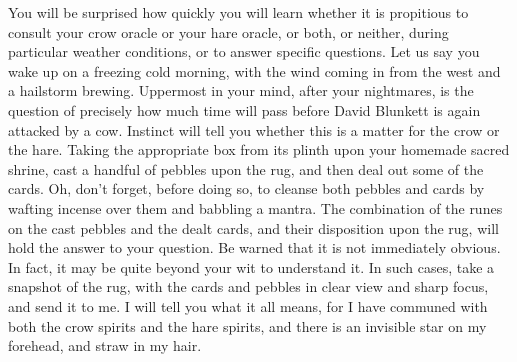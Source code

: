 You will be surprised how quickly you will learn whether it is propitious to consult your crow oracle or your hare oracle, or both, or neither, during particular weather conditions, or to answer specific questions. Let us say you wake up on a freezing cold morning, with the wind coming in from the west and a hailstorm brewing. Uppermost in your mind, after your nightmares, is the question of precisely how much time will pass before David Blunkett is again attacked by a cow. Instinct will tell you whether this is a matter for the crow or the hare. Taking the appropriate box from its plinth upon your homemade sacred shrine, cast a handful of pebbles upon the rug, and then deal out some of the cards. Oh, don't forget, before doing so, to cleanse both pebbles and cards by wafting incense over them and babbling a mantra. The combination of the runes on the cast pebbles and the dealt cards, and their disposition upon the rug, will hold the answer to your question. Be warned that it is not immediately obvious. In fact, it may be quite beyond your wit to understand it. In such cases, take a snapshot of the rug, with the cards and pebbles in clear view and sharp focus, and send it to me. I will tell you what it all means, for I have communed with both the crow spirits and the hare spirits, and there is an invisible star on my forehead, and straw in my hair.

